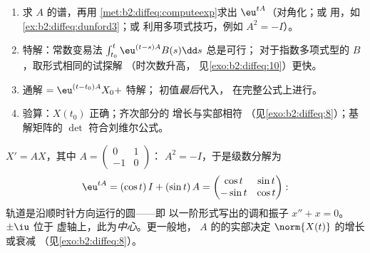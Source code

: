\begin{method}[从头到尾求解 $X' = AX + B(t)$]\label{met:b2:diffeq:solvelinear}
\begin{enumerate}
  \item 求 $A$ 的谱，再用
        \cref{met:b2:diffeq:computeexp}求出 $\eu^{tA}$（对角化；或
        用，如\cref{ex:b2:diffeq:dunford3}；或
        利用多项式技巧，例如 $A^2 = -I$）。
  \item 特解：常数变易法
        $\int_{t_0}^t\eu^{(t-s)A}B(s)\dd s$ 总是可行；
        对于指数多项式型的 $B$，取形式相同的试探解
        （时次数升高，
        见\cref{exo:b2:diffeq:10}）更快。
  \item 通解 $= \eu^{(t-t_0)A}X_0 +$ 特解；
        初值\emph{最后}代入，
        在完整公式上进行。
  \item 验算：$X(t_0)$ 正确；齐次部分的
        增长与实部相符
        （见\cref{exo:b2:diffeq:8}）；基解矩阵的 $\det$
        符合刘维尔公式。
\end{enumerate}
\end{method}

\begin{example}[相图示例]\label{ex:b2:diffeq:phaseportrait}
$X' = AX$，其中 $A = \begin{pmatrix} 0 & 1\\ -1 & 0\end{pmatrix}$：
$A^2 = -I$，于是级数分解为
\[
\eu^{tA} = (\cos t)\,I + (\sin t)\,A
= \begin{pmatrix} \cos t & \sin t\\ -\sin t & \cos t
\end{pmatrix} :
\]
轨道是沿顺时针方向运行的圆——即
以一阶形式写出的调和振子 $x'' + x = 0$。 $\pm\iu$ 位于
虚轴上，此为\emph{中心}。更一般地，
$A$ 的的实部决定 $\norm{X(t)}$ 的增长或衰减
（见\cref{exo:b2:diffeq:8}）。
\end{example}

